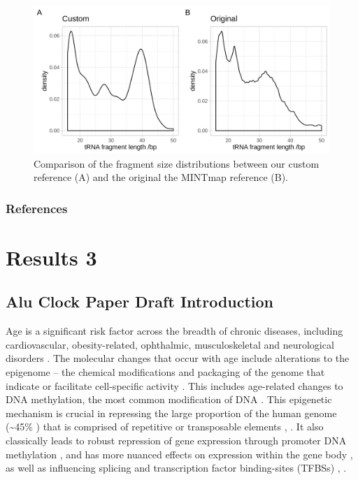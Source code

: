 \documentclass[]{book}
\begin{document}
\begin{figure}

{\centering \includegraphics[width=1\linewidth]{./figs/combinedFragSizeDists} 

}

\caption{Comparison of the fragment size distributions between our custom reference (A) and the original the MINTmap reference (B).}\label{fig:combinedFragSizeDists}
\end{figure}



\newpage

\hypertarget{refs}{%
\section{References}\label{refs}}

\hypertarget{part-results-3}{%
\part{Results 3}\label{part-results-3}}

\hypertarget{AluIntro}{%
\chapter{Alu Clock Paper Draft Introduction}\label{AluIntro}}

Age is a significant risk factor across the breadth of chronic diseases, including cardiovascular, obesity-related, ophthalmic, musculoskeletal and neurological disorders \citep{Partridge2018}.
The molecular changes that occur with age include alterations to the epigenome \citep{Booth2016} -- the chemical modifications and packaging of the genome that indicate or facilitate cell-specific activity \citep{Bird2007}.
This includes age-related changes to DNA methylation, the most common modification of DNA \citep{Lopez-Otin2013}.
This epigenetic mechanism is crucial in repressing the large proportion of the human genome (\textasciitilde45\% \citep{Gregory2005}) that is comprised of repetitive or transposable elements \citep{Deniz2019}, \citep{Kazazian2017}.
It also classically leads to robust repression of gene expression through promoter DNA methylation \citep{Deaton2011}, and has more nuanced effects on expression within the gene body \citep{Hellman2007}, as well as influencing splicing \citep{Shukla2011} and transcription factor binding-sites (TFBSs) \citep{Blattler2014}, \citep{Yin2017}.
\end{document}
